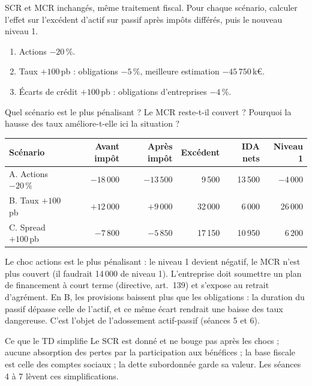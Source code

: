 \documentclass[11pt,a4paper]{article}
\newcommand{\keur}{\,k\euro}
\begin{document}
\begin{exercice}
SCR et MCR inchangés, même traitement fiscal. Pour chaque scénario, calculer l'effet sur
l'excédent d'actif sur passif après impôts différés, puis le nouveau niveau 1.
\begin{enumerate}[nosep]
  \item[A.] Actions $-20\,\%$.
  \item[B.] Taux $+100$\,pb : obligations $-5\,\%$, meilleure estimation $-45\,750$\keur.
  \item[C.] Écarts de crédit $+100$\,pb : obligations d'entreprises $-4\,\%$.
\end{enumerate}
Quel scénario est le plus pénalisant ? Le MCR reste-t-il couvert ? Pourquoi la hausse des taux
améliore-t-elle ici la situation ?
\end{exercice}
\begin{corrige}
\begin{center}
\begin{tabular}{lrrrrr}
\toprule
Scénario & Avant impôt & Après impôt & Excédent & IDA nets & Niveau 1 \\
\midrule
A. Actions $-20\,\%$   & $-18\,000$ & $-13\,500$ &  9\,500 & 13\,500 & $-4\,000$ \\
B. Taux $+100$\,pb      & $+12\,000$ &  $+9\,000$ & 32\,000 &  6\,000 & 26\,000 \\
C. Spread $+100$\,pb    &  $-7\,800$ &  $-5\,850$ & 17\,150 & 10\,950 &  6\,200 \\
\bottomrule
\end{tabular}
\end{center}
Le choc actions est le plus pénalisant : le niveau 1 devient négatif, le MCR n'est plus couvert
(il faudrait 14\,000 de niveau 1). L'entreprise doit soumettre un plan de financement à court
terme (directive, art.~139) et s'expose au retrait d'agrément. En B, les provisions baissent plus
que les obligations : la duration du passif dépasse celle de l'actif, et ce même écart rendrait
une baisse des taux dangereuse. C'est l'objet de l'adossement actif-passif (séances 5 et 6).
\end{corrige}

\begin{generalisation}{Ce que le TD simplifie}
Le SCR est donné et ne bouge pas après les chocs ; aucune absorption des pertes par la
participation aux bénéfices ; la base fiscale est celle des comptes sociaux ; la dette subordonnée
garde sa valeur. Les séances 4 à 7 lèvent ces simplifications.
\end{generalisation}
\end{document}

